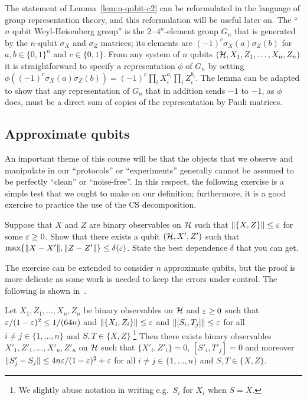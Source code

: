 \begin{remark}
The statement of Lemma~\ref{lem:n-qubit-c2} can be reformulated in the language of group representation theory, and this reformulation will be useful later on. The ``$n$ qubit Weyl-Heisenberg group'' is the $2\cdot 4^n$-element group $G_n$ that is generated by the $n$-qubit $\sigma_X$ and $\sigma_Z$ matrices; its elements are $(-1)^c\sigma_X(a)\sigma_Z(b)$ for $a,b\in\{0,1\}^n$ and $c\in\{0,1\}$. From any system of $n$ qubits $(\mathcal{H},X_1,Z_1,\ldots,X_n,Z_n)$ it is straightforward to specify a representation $\phi$ of $G_n$ by setting $\phi((-1)^c\sigma_X(a)\sigma_Z(b)) = (-1)^c \prod_i X_i^{a_i} \prod_i Z_i^{b_i}$. The lemma can be adapted to show that any representation of $G_n$ that in addition sends $-1$ to $-1$, as $\phi$ does, must be a direct sum of copies of the representation by Pauli matrices. 
\end{remark}

\subsection{Approximate qubits}

An important theme of this course will be that the objects that we observe and manipulate in our ``protocols'' or ``experiments'' generally cannot be assumed to be perfectly ``clean'' or ``noise-free''. In this respect, the following exercise is a simple test that we ought to make on our definition; furthermore, it is a good exercise to practice the use of the CS decomposition. 

\begin{exercise}
Suppose that $X$ and $Z$ are binary observables on $\mathcal{H}$ such that $\|\{X,Z\}\|\leq \varepsilon$ for some $\varepsilon \geq 0$. Show that there exists a qubit $(\mathcal{H},X',Z')$ such that $\max\{\|X-X'\|,\|Z-Z'\|\} \leq \delta(\varepsilon)$. State the best dependence $\delta$ that you can get. 
\end{exercise} 

The exercise can be extended to consider $n$ approximate qubits, but the proof is more delicate as some work is needed to keep the errors under control. The following is shown in~\cite{chao2017overlapping}. 

\begin{theorem}
Let $X_1,Z_1,\ldots,X_n,Z_n$ be binary observables on $\mathcal{H}$ and $\varepsilon \geq 0$ such that $\varepsilon/(1-\varepsilon)^2 \leq 1/(64n)$ and $\|\{X_i,Z_i\}\|\leq \varepsilon$ and $\|[S_i,T_j]\|\leq \varepsilon$ for all $i\neq j \in \{1,\ldots, n\}$ and $S,T \in \{X,Z\}$.\footnote{We slightly abuse notation in writing e.g.\ $S_i$ for $X_i$ when $S=X$.} Then there exists  binary observables $X'_1,Z'_1,\ldots,X'_n,Z'_n$ on $\mathcal{H}$ such that $\{X'_i,Z'_i\}=0$, $[S'_i,T'_j]=0$ and moreover $\|S'_j-S_j\| \leq 4n\varepsilon/(1-\varepsilon)^2 + \varepsilon$ for all $i\neq j\in \{1,\ldots,n\}$ and $S,T\in\{X,Z\}$.
\end{theorem}


